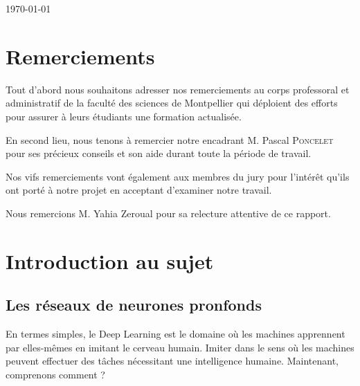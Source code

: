 \documentclass[oneside,13pt,a4paper]{report}
\begin{document}
\begin{titlepage}
	\par\vspace{1cm}

	\vfill

	{\large \today\par}
\end{titlepage}


\parskip=5pt
\chapter*{Remerciements}
\begin{center}

	Tout d'abord nous souhaitons adresser nos remerciements au corps professoral et administratif de la faculté des sciences de Montpellier qui déploient des efforts pour assurer à leurs étudiants une formation actualisée.

	En second lieu, nous tenons à remercier notre encadrant M. Pascal \textsc{Poncelet} pour ses précieux conseils et son aide durant toute la période de travail.

	Nos vifs remerciements vont également aux membres du jury pour l’intérêt qu’ils ont porté à notre projet en acceptant d’examiner notre travail.

	Nous remercions M. Yahia Zeroual pour sa relecture attentive de ce rapport.

\end{center}

\parskip=0pt
\tableofcontents

\parskip=5pt



\chapter{Introduction au sujet}

\section{Les réseaux de neurones pronfonds}

En termes simples, le Deep Learning est le domaine où les machines apprennent par elles-mêmes en imitant le cerveau humain. Imiter dans le sens où les machines peuvent effectuer des tâches nécessitant une intelligence humaine. Maintenant, comprenons comment ?
\end{document}
